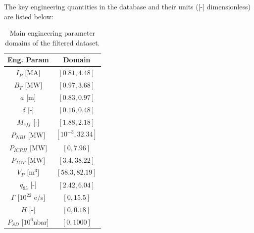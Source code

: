 \documentclass[a4paper, twoside, final, 12pt]{article}
\begin{document}
The key engineering quantities in the database and their units ([-] dimensionless) are listed below:

\begin{table}
\centering
\caption{Main engineering parameter domains of the filtered dataset.}
\label{tab:main_domain}
\begin{tabular}{| c | c | }
	\hline
	Eng. Param & Domain \\
	\hline
	$I_P$ [MA] & $[0.81, 4.48]$ \\
	$B_T$ [MW] & $[0.97, 3.68]$ \\
	$a$ [m] & $[0.83, 0.97]$ \\
	$\delta$ [-] & $[0.16, 0.48]$ \\
	$M_{eff}$ [-] & $[1.88, 2.18]$ \\
	$P_{NBI}$ [MW] & $[10^{-3}, 32.34]$ \\
	$P_{ICRH}$ [MW] & $[0, 7.96]$ \\
	$P_{TOT}$ [MW] & $[3.4, 38.22]$ \\
	$V_P$ [m$^3$] &  $[58.3, 82.19]$ \\
	$q_{95}$ [-] & $[2.42, 6.04]$ \\
	$\Gamma$ [$10^{22}$ e/s] & $[0, 15.5]$ \\
	$H$ [-] & $[0, 0.18]$ \\
	$P_{SD}$ [$10^6$nbar] & $[0,1000]$ \\
	\hline
\end{tabular}
\end{table}
\end{document}
